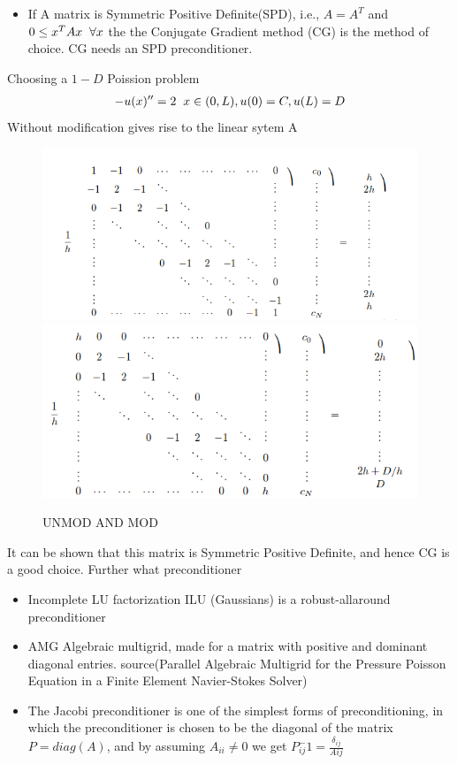 \documentclass[a4paper,norsk]{article}
\begin{document}
\begin{itemize}
\item If A matrix is Symmetric Positive Definite(SPD), i.e., $A = A^T$ and $ 0 \leq x^T A x \hspace{2mm }\forall x$ the the Conjugate
Gradient method (CG) is the method of choice. CG needs an SPD preconditioner.
\end{itemize}
Choosing a $1-D$ Poission problem 
\begin{align*}
- u(x)'' = 2 \hspace{2mm} x \in (0, L), u(0) = C, u(L) = D 
\end{align*}
Without modification gives rise to the linear sytem A
\begin{figure}[h!]
\centering
\caption{UNMOD AND MOD}
\includegraphics[scale=0.4]{unmod.png}
\includegraphics[scale=0.4]{mod.png}
\end{figure}
It can be shown that this matrix is  Symmetric Positive Definite, and hence CG is a good choice. Further what preconditioner
\begin{itemize}
\item Incomplete LU factorization ILU (Gaussians) is a robust-allaround preconditioner
\item AMG Algebraic multigrid, made for a matrix with positive and dominant diagonal entries. \newline
source(Parallel Algebraic Multigrid for the Pressure Poisson Equation in a Finite Element Navier-Stokes Solver)
\item The Jacobi preconditioner is one of the simplest forms of preconditioning, in which the preconditioner is chosen to be the diagonal of the matrix \newline
$P = diag(A)$, and by assuming $A_{ii} \neq 0$ we get $P_{ij}^-1 = \frac{\delta_{ij}}{A{ij}}$
\end{itemize}
\end{document}

